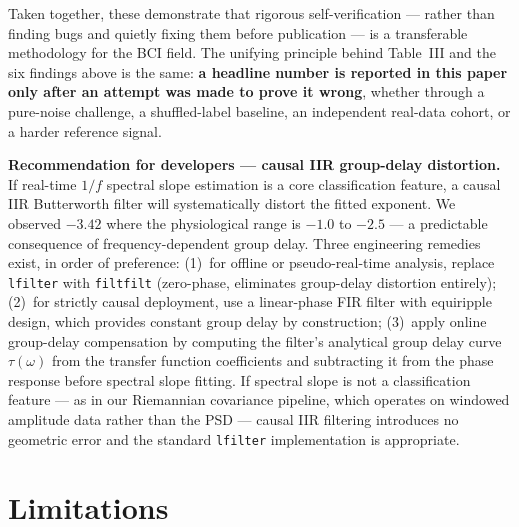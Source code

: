 \documentclass[11pt]{article}
\newcommand{\code}[1]{\texttt{#1}}
\begin{document}
Taken together, these demonstrate that rigorous self-verification --- rather than finding bugs and quietly fixing them before publication --- is a transferable methodology for the BCI field. The unifying principle behind Table~III and the six findings above is the same: \textbf{a headline number is reported in this paper only after an attempt was made to prove it wrong}, whether through a pure-noise challenge, a shuffled-label baseline, an independent real-data cohort, or a harder reference signal.

\textbf{Recommendation for developers --- causal IIR group-delay distortion.} If real-time $1/f$ spectral slope estimation is a core classification feature, a causal IIR Butterworth filter will systematically distort the fitted exponent. We observed $-3.42$ where the physiological range is $-1.0$ to $-2.5$ --- a predictable consequence of frequency-dependent group delay. Three engineering remedies exist, in order of preference: (1)~for offline or pseudo-real-time analysis, replace \code{lfilter} with \code{filtfilt} (zero-phase, eliminates group-delay distortion entirely); (2)~for strictly causal deployment, use a linear-phase FIR filter with equiripple design, which provides constant group delay by construction; (3)~apply online group-delay compensation by computing the filter's analytical group delay curve $\tau(\omega)$ from the transfer function coefficients and subtracting it from the phase response before spectral slope fitting. If spectral slope is not a classification feature --- as in our Riemannian covariance pipeline, which operates on windowed amplitude data rather than the PSD --- causal IIR filtering introduces no geometric error and the standard \code{lfilter} implementation is appropriate.

\section{Limitations}
\end{document}
